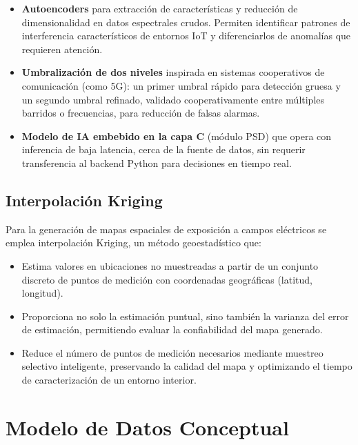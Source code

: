 \documentclass[12pt,a4paper]{article}
\begin{document}
\begin{itemize}
  \item \textbf{Autoencoders} para extracción de características y reducción de dimensionalidad en datos espectrales crudos. Permiten identificar patrones de interferencia característicos de entornos IoT y diferenciarlos de anomalías que requieren atención.
  \item \textbf{Umbralización de dos niveles} inspirada en sistemas cooperativos de comunicación (como 5G): un primer umbral rápido para detección gruesa y un segundo umbral refinado, validado cooperativamente entre múltiples barridos o frecuencias, para reducción de falsas alarmas.
  \item \textbf{Modelo de IA embebido en la capa C} (módulo PSD) que opera con inferencia de baja latencia, cerca de la fuente de datos, sin requerir transferencia al backend Python para decisiones en tiempo real.
\end{itemize}

\subsection{Interpolación Kriging}

Para la generación de mapas espaciales de exposición a campos eléctricos se emplea interpolación Kriging, un método geoestadístico que:

\begin{itemize}
  \item Estima valores en ubicaciones no muestreadas a partir de un conjunto discreto de puntos de medición con coordenadas geográficas (latitud, longitud).
  \item Proporciona no solo la estimación puntual, sino también la varianza del error de estimación, permitiendo evaluar la confiabilidad del mapa generado.
  \item Reduce el número de puntos de medición necesarios mediante muestreo selectivo inteligente, preservando la calidad del mapa y optimizando el tiempo de caracterización de un entorno interior.
\end{itemize}

\section{Modelo de Datos Conceptual}
\end{document}
